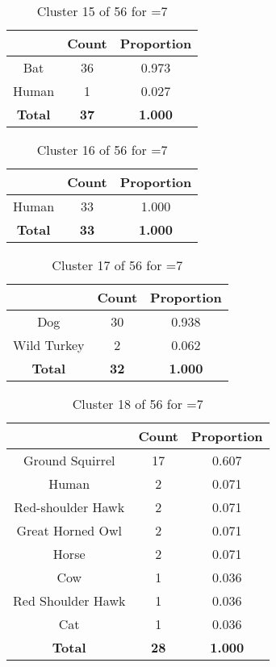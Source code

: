 \begin{table}[ht!]
\centering
\begin{tabular}{|c|c|c|}
\hline
\bf \Spec{} &\bf Count &\bf Proportion\\ \hline \hline
Bat & 36 & 0.973\\ \hline
Human & 1 & 0.027\\ \hline
\hline
\bf Total & \bf 37 & \bf 1.000\\ \hline
\end{tabular}
\label{tab:cluster:15:7}
\caption{Cluster 15 of 56 for \minneigh{}=7}
\end{table}

\begin{table}[ht!]
\centering
\begin{tabular}{|c|c|c|}
\hline
\bf \Spec{} &\bf Count &\bf Proportion\\ \hline \hline
Human & 33 & 1.000\\ \hline
\hline
\bf Total & \bf 33 & \bf 1.000\\ \hline
\end{tabular}
\label{tab:cluster:16:7}
\caption{Cluster 16 of 56 for \minneigh{}=7}
\end{table}

\begin{table}[ht!]
\centering
\begin{tabular}{|c|c|c|}
\hline
\bf \Spec{} &\bf Count &\bf Proportion\\ \hline \hline
Dog & 30 & 0.938\\ \hline
Wild Turkey & 2 & 0.062\\ \hline
\hline
\bf Total & \bf 32 & \bf 1.000\\ \hline
\end{tabular}
\label{tab:cluster:17:7}
\caption{Cluster 17 of 56 for \minneigh{}=7}
\end{table}

\begin{table}[ht!]
\centering
\begin{tabular}{|c|c|c|}
\hline
\bf \Spec{} &\bf Count &\bf Proportion\\ \hline \hline
Ground Squirrel & 17 & 0.607\\ \hline
Human & 2 & 0.071\\ \hline
Red-shoulder Hawk & 2 & 0.071\\ \hline
Great Horned Owl & 2 & 0.071\\ \hline
Horse & 2 & 0.071\\ \hline
Cow & 1 & 0.036\\ \hline
Red Shoulder Hawk & 1 & 0.036\\ \hline
Cat & 1 & 0.036\\ \hline
\hline
\bf Total & \bf 28 & \bf 1.000\\ \hline
\end{tabular}
\label{tab:cluster:18:7}
\caption{Cluster 18 of 56 for \minneigh{}=7}
\end{table}

